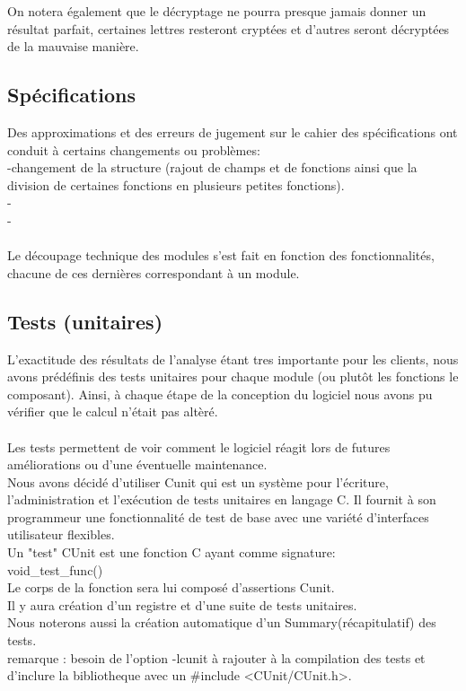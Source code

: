 \documentclass[a4]{article}
\begin{document}
    On notera également que le décryptage ne pourra presque jamais donner un résultat parfait, certaines lettres resteront 
    cryptées et d'autres seront décryptées de la mauvaise manière. 
		
		\subsection{Spécifications}
		Des approximations et des erreurs de jugement sur le cahier des spécifications ont conduit à certains changements ou problèmes:\\
		-changement de la structure (rajout de champs et de fonctions ainsi que la division de certaines fonctions en plusieurs
		 petites fonctions).\\
		
    -\\
		
    -\\ \\
		

		Le découpage technique des modules s'est fait en fonction des fonctionnalités, chacune de ces dernières correspondant 
    à un module.
		
		\subsection{Tests (unitaires)}
		L’exactitude des résultats de l'analyse étant tres importante pour les clients, nous avons prédéfinis des tests
unitaires pour chaque module (ou plutôt les fonctions le composant). Ainsi, à chaque étape de la conception du logiciel
nous avons pu vérifier que le calcul n’était pas altèré. \\ \\
Les tests permettent de voir comment le logiciel réagit lors de futures améliorations ou d'une éventuelle maintenance. \\ 
 
Nous avons décidé d'utiliser Cunit qui est un système pour l'écriture, l'administration et l'exécution de tests unitaires
en langage C. Il fournit à son programmeur une fonctionnalité de test de base avec une variété d'interfaces utilisateur flexibles.\\
Un "test"  CUnit est une fonction C ayant comme signature:\\
void\_test\_func()\\
Le corps de la fonction sera lui composé d'assertions Cunit.\\
Il y aura création d'un registre et d'une suite de tests unitaires.\\
Nous noterons aussi la création automatique d'un Summary(récapitulatif) des tests.\\
remarque : besoin de l'option -lcunit à rajouter à la compilation des tests et d'inclure la bibliotheque avec un
\#include <CUnit/CUnit.h>.\\ \\ \\ 
\end{document}
